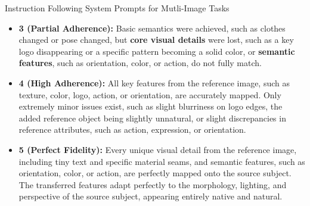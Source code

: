 \documentclass{llmxive}
\begin{document}
\begin{promptbox}[label={System Prompts: IF_Multi-Image}]{Instruction Following System Prompts for Mutli-Image Tasks}
\begin{itemize}[leftmargin=2.2em, labelsep=0.4em, itemsep=2pt]
    \item \textbf{3 (Partial Adherence):} Basic semantics were achieved, such as clothes changed or pose changed, but \textbf{core visual details} were lost, such as a key logo disappearing or a specific pattern becoming a solid color, or \textbf{semantic features}, such as orientation, color, or action, do not fully match.
    
    \item \textbf{4 (High Adherence):} All key features from the reference image, such as texture, color, logo, action, or orientation, are accurately mapped. Only extremely minor issues exist, such as slight blurriness on logo edges, the added reference object being slightly unnatural, or slight discrepancies in reference attributes, such as action, expression, or orientation.
    
    \item \textbf{5 (Perfect Fidelity):} Every unique visual detail from the reference image, including tiny text and specific material seams, and semantic features, such as orientation, color, or action, are perfectly mapped onto the source subject. The transferred features adapt perfectly to the morphology, lighting, and perspective of the source subject, appearing entirely native and natural.
\end{itemize}


\end{promptbox}
\end{document}
